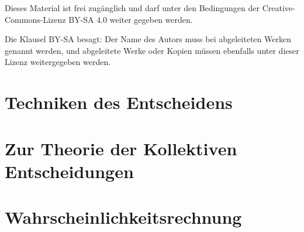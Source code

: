 \documentclass[12pt, a4paper, german]{book}
\numberwithin{equation}{section}
\begin{document}
\begin{titlepage}
\begin{center}
\vspace{0.5cm}

\begin{small}

Dieses Material ist frei zugänglich und darf unter den Bedingungen der
Creative-Commons-Lizenz BY-SA 4.0 weiter gegeben werden.

\vspace{0.5cm}

Die Klausel BY-SA besagt: Der Name des Autors muss bei abgeleiteten Werken
genannt werden, und abgeleitete Werke oder Kopien müssen ebenfalls unter
dieser Lizenz weitergegeben werden.

\end{small}

\end{center}

\end{titlepage}

\tableofcontents
\newpage 
 
\setlength{\marginparwidth}{2cm}



\chapter{Techniken des Entscheidens}


\newpage

 
\newpage
 
\newpage


\newpage

\newpage


\newpage

\newpage



\chapter{Zur Theorie der Kollektiven Entscheidungen}


\newpage


\newpage

\newpage




\chapter{Wahrscheinlichkeitsrechnung}
\end{document}
